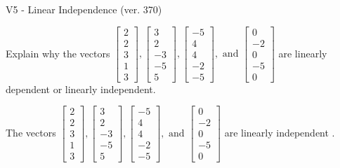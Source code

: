 \begin{exercise}
  \begin{exerciseTitle}V5 - Linear Independence (ver. 370)\end{exerciseTitle}
  \begin{exerciseStatement}
    Explain why the vectors \(\left[\begin{array}{r}
2 \\
2 \\
3 \\
1 \\
3
\end{array}\right] , \left[\begin{array}{r}
3 \\
2 \\
-3 \\
-5 \\
5
\end{array}\right] , \left[\begin{array}{r}
-5 \\
4 \\
4 \\
-2 \\
-5
\end{array}\right] , \text{ and } \left[\begin{array}{r}
0 \\
-2 \\
0 \\
-5 \\
0
\end{array}\right]\) are linearly dependent or linearly independent.	


  \end{exerciseStatement}
  \begin{exerciseAnswer}
   The vectors \(\left[\begin{array}{r}
2 \\
2 \\
3 \\
1 \\
3
\end{array}\right] , \left[\begin{array}{r}
3 \\
2 \\
-3 \\
-5 \\
5
\end{array}\right] , \left[\begin{array}{r}
-5 \\
4 \\
4 \\
-2 \\
-5
\end{array}\right] , \text{ and } \left[\begin{array}{r}
0 \\
-2 \\
0 \\
-5 \\
0
\end{array}\right]\) are 
  	 linearly independent  .
  


  \end{exerciseAnswer}
\end{exercise}